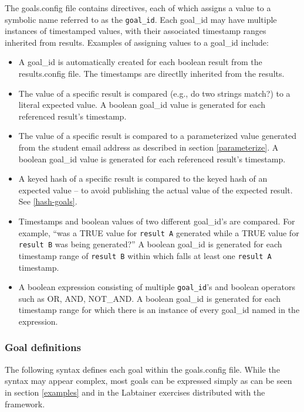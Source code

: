 \documentclass[12pt]{article}
\begin{document}
The goals.config file contains directives, each of which assigns a value to a symbolic name referred
to as the {\tt goal\_id}.  Each goal\_id may have multiple instances of timestamped values, with their
associated timestamp ranges inherited from results.  Examples of assigning values to a goal\_id include:
\begin{itemize}
\item A goal\_id is automatically created for each boolean result from the results.config file.  The timestamps
are directlly inherited from the results.

\item The value of a specific result is compared (e.g., do two strings match?) to a literal expected value.
A boolean goal\_id value is generated for each referenced result's timestamp.

\item The value of a specific result is compared to a parameterized value
generated from the student email address as described in section \ref{parameterize}.
A boolean goal\_id value is generated for each referenced result's timestamp.

\item A keyed hash of a specific result is compared to the keyed hash of an expected value -- to avoid
publishing the actual value of the expected result.  See \ref{hash-goals}.

\item Timestamps and boolean values of two different goal\_id's are compared.  For example, ``was
a TRUE value for {\tt result A} generated while a TRUE value for {\tt result B} was being generated?''  
A boolean goal\_id is generated for each
timestamp range of {\tt result B} within which falls at least one {\tt result A} timestamp.

\item A boolean expression consisting of multiple {\tt goal\_id}'s and boolean operators such as OR, AND, NOT\_AND.
A boolean goal\_id is generated for each timestamp range for which there is an instance of every goal\_id named
in the expression.
\end{itemize}

\subsubsection{Goal definitions}
The following syntax defines each goal within the goals.config file.  While the syntax
may appear complex, most goals can be expressed simply as can be seen in section \ref{examples} and
in the Labtainer exercises distributed with the framework.
\end{document}
